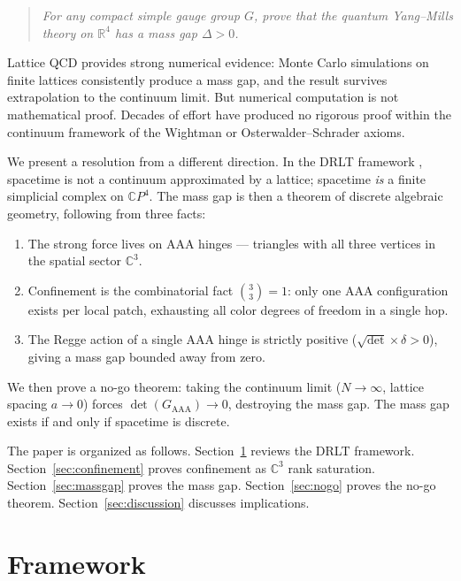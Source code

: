 \documentclass[12pt]{article}
\theoremstyle{remark}
\begin{document}
\begin{quote}
\emph{For any compact simple gauge group $G$, prove that the quantum
Yang--Mills theory on $\mathbb{R}^4$ has a mass gap $\Delta > 0$.}
\end{quote}

\noindent
Lattice QCD \cite{Wilson, Creutz} provides strong numerical evidence:
Monte Carlo simulations on finite lattices consistently produce a mass
gap, and the result survives extrapolation to the continuum limit. But
numerical computation is not mathematical proof. Decades of effort have
produced no rigorous proof within the continuum framework of the Wightman
\cite{Wightman} or Osterwalder--Schrader \cite{OS} axioms.

We present a resolution from a different direction. In the DRLT framework
\cite{DRLT, DRLT-rep}, spacetime is not a continuum approximated by a
lattice; spacetime \emph{is} a finite simplicial complex on
$\mathbb{C}P^4$. The mass gap is then a theorem of discrete algebraic
geometry, following from three facts:

\begin{enumerate}
\item The strong force lives on AAA hinges --- triangles with all three
  vertices in the spatial sector $\mathbb{C}^3$.
\item Confinement is the combinatorial fact $\binom{3}{3} = 1$: only one
  AAA configuration exists per local patch, exhausting all color degrees
  of freedom in a single hop.
\item The Regge action of a single AAA hinge is strictly positive
  ($\sqrt{\det} \times \delta > 0$), giving a mass gap bounded away
  from zero.
\end{enumerate}

We then prove a no-go theorem: taking the continuum limit
($N \to \infty$, lattice spacing $a \to 0$) forces
$\det(G_{\mathrm{AAA}}) \to 0$, destroying the mass gap. The mass gap
exists if and only if spacetime is discrete.

The paper is organized as follows. Section~\ref{sec:framework} reviews
the DRLT framework. Section~\ref{sec:confinement} proves confinement as
$\mathbb{C}^3$ rank saturation. Section~\ref{sec:massgap} proves the
mass gap. Section~\ref{sec:nogo} proves the no-go theorem.
Section~\ref{sec:discussion} discusses implications.

\section{Framework}
\label{sec:framework}
\end{document}
